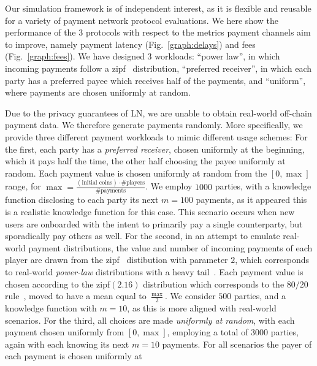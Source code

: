   Our simulation framework is of independent interest, as it is flexible
  and reusable for a variety of payment network protocol evaluations.
  We here
  show the performance of the $3$ protocols with respect to the metrics payment
  channels aim to improve, namely payment latency (Fig.~\ref{graph:delays}) and
  fees (Fig.~\ref{graph:fees}). We have designed 3 workloads: ``power law'', in
  which incoming payments follow a zipf~\cite{powers-1998-applications}
  distribution, ``preferred receiver'', in which each party has a preferred
  payee which receives half of the payments, and ``uniform'', where payments are
  chosen uniformly at random.

  Due to the privacy guarantees of LN, we are unable to obtain real-world
  off-chain payment data. We therefore generate payments randomly. More
  specifically, we provide three different payment workloads to mimic
  different usage schemes: For the first, each party has a \emph{preferred
  receiver}, chosen
  uniformly at the beginning, which it pays half the time, the other half
  choosing the payee uniformly at random. Each payment value is chosen
  uniformly at random from the $[0, \max]$ range, for $\max =
  \frac{(\text{initial coins}) \cdot \text{\#players}}{\text{\#payments}}$. We
  employ $1000$ parties, with a knowledge function disclosing to each party its
  next $m=100$ payments, as it appeared this is a realistic knowledge function
  for this case. This scenario occurs when new users are onboarded with
  the intent to primarily pay a single counterparty, but sporadically pay
  others as well. For the second, in an attempt to emulate real-world payment
  distributions, the value and number of incoming payments of each player are
  drawn from the zipf~\cite{powers-1998-applications} distibution with
  parameter $2$, which corresponds to real-world \emph{power-law} distributions
  with a heavy tail~\cite{DBLP:journals/cn/BroderKMRRSTW00}. Each payment value
  is chosen according to the
  zipf$(2.16)$ distribution which corresponds to the $80/20$
  rule~\cite{pareto}, moved to have a mean equal to $\frac{\max}{2}$. We
  consider $500$ parties, and a knowledge function with $m=10$, as this is more
  aligned with real-world scenarios. For the third, all choices are made
  \emph{uniformly at random}, with each payment chosen uniformly from $[0,
  \max]$, employing a
  total of $3000$ parties, again with each knowing its next $m=10$ payments.
  For all scenarios the payer of each payment is chosen uniformly at
